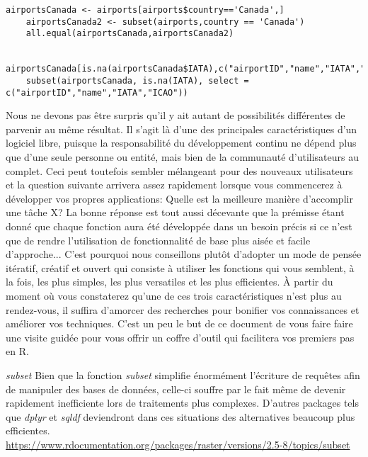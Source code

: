 \begin{lstlisting}[caption = Filtrer les données,label=src:Filter]
	airportsCanada <- airports[airports$country=='Canada',]
	airportsCanada2 <- subset(airports,country == 'Canada')
	all.equal(airportsCanada,airportsCanada2)

	airportsCanada[is.na(airportsCanada$IATA),c("airportID","name","IATA","ICAO")]
	subset(airportsCanada, is.na(IATA), select = c("airportID","name","IATA","ICAO"))
\end{lstlisting}

\vspace{\baselineskip}
Nous ne devons pas être surpris qu'il y ait autant de possibilités différentes de parvenir au même résultat. Il s'agit là d'une des principales caractéristiques d'un logiciel libre, puisque la responsabilité du développement continu ne dépend plus que d'une seule personne ou entité, mais bien de la communauté d'utilisateurs au complet. Ceci peut toutefois sembler mélangeant pour des nouveaux utilisateurs et la question suivante arrivera assez rapidement lorsque vous commencerez à développer vos propres applications: Quelle est la meilleure manière d'accomplir une tâche X? La bonne réponse est tout aussi décevante que la prémisse étant donné que chaque fonction aura été développée dans un besoin précis si ce n'est que de rendre l'utilisation de fonctionnalité de base plus aisée et facile d'approche... C'est pourquoi nous conseillons plutôt d'adopter un mode de pensée itératif, créatif et ouvert qui consiste à utiliser les fonctions qui vous semblent, à la fois, les plus simples, les plus versatiles et les plus efficientes. À partir du moment où vous constaterez qu'une de ces trois caractéristiques n'est plus au rendez-vous, il suffira d'amorcer des recherches pour bonifier vos connaissances et améliorer vos techniques. C'est un peu le but de ce document de vous faire faire une visite guidée pour vous offrir un coffre d'outil qui facilitera vos premiers pas en R. \\

\begin{moreInfo}{\emph{subset}}
	Bien que la fonction \emph{subset} simplifie énormément l'écriture de requêtes afin de manipuler des bases de données, celle-ci souffre par le fait même de devenir rapidement inefficiente lors de traitements plus complexes. D'autres packages tels que \emph{dplyr} et \emph{sqldf} deviendront dans ces situations des alternatives beaucoup plus efficientes. \\
	\url{https://www.rdocumentation.org/packages/raster/versions/2.5-8/topics/subset}
\end{moreInfo}

